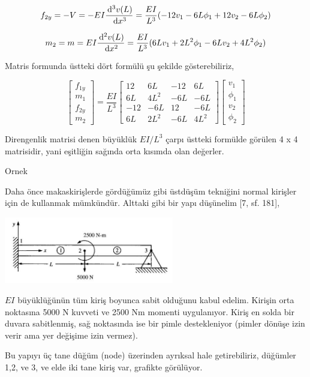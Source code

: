 \documentclass[12pt,fleqn]{article}\usepackage{../../common}
\begin{document}
$$
f_{2y} = -V = -EI \frac{\,\mathrm{d}^3 v(L)}{\,\mathrm{d} x^3} =
\frac{EI}{L^3} (-12 v_1 - 6L \phi_1 + 12 v_2 - 6L \phi_2 )
$$

$$
m_2 = m = EI \frac{\,\mathrm{d}^2 v(L)}{\,\mathrm{d} x^2} =
\frac{EI}{L^3} ( 6L v_1 + 2L^2 \phi_1 - 6L v_2 + 4 L^2 \phi_2)
$$

Matris formunda üstteki dört formülü şu şekilde gösterebiliriz,

$$
\left[\begin{array}{c}
f_{1y} \\ m_1 \\ f_{2y} \\ m_2
\end{array}\right] =
\frac{EI}{L^3}
\left[\begin{array}{cccc}
12 & 6L & -12 & 6L \\
6L & 4L^2 & -6L & -6L \\
-12 & -6L & 12 & -6L \\
6L & 2L^2 & -6L & 4L^2
\end{array}\right]
\left[\begin{array}{ccc}
v_1 \\ \phi_1 \\ v_2 \\ \phi_2
\end{array}\right]
$$

Direngenlik matrisi denen büyüklük $EI / L^3$ çarpı üstteki formülde görülen
4 x 4 matrisidir, yani eşitliğin sağında orta kısımda olan değerler.

Ornek

Daha önce makaskirişlerde gördüğümüz gibi üstdüşüm tekniğini normal kirişler
için de kullanmak mümkündür. Alttaki gibi bir yapı düşünelim [7, sf. 181],

\includegraphics[width=20em]{phy_020_strs_06_01.jpg}

$EI$ büyüklüğünün tüm kiriş boyunca sabit olduğunu kabul edelim. Kirişin orta
noktasına 5000 N kuvveti ve 2500 Nm momenti uygulanıyor. Kiriş en solda bir
duvara sabitlenmiş, sağ noktasında ise bir pimle destekleniyor (pimler
dönüşe izin verir ama yer değişime izin vermez). 

Bu yapıyı üç tane düğüm (node) üzerinden ayrıksal hale getirebiliriz,
düğümler 1,2, ve 3, ve elde iki tane kiriş var, grafikte görülüyor.
\end{document}
